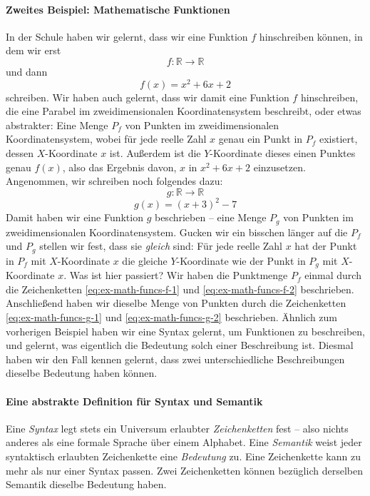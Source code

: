 \documentclass{article}
\begin{document}
\paragraph{Zweites Beispiel: Mathematische Funktionen}
In der Schule haben wir gelernt, dass wir eine Funktion $f$ hinschreiben 
können, in dem wir erst 
\begin{equation}
 f : \mathds{R}\rightarrow\mathds{R}
 \label{eq:ex-math-funcs-f-1}
\end{equation}
und dann 
\begin{equation}
 f(x) = x^2 + 6x + 2
 \label{eq:ex-math-funcs-f-2}
\end{equation}
schreiben. Wir haben auch gelernt, dass wir damit eine Funktion $f$ 
hinschreiben, die eine Parabel im zweidimensionalen Koordinatensystem 
beschreibt, oder etwas abstrakter: Eine Menge $P_f$ von Punkten im 
zweidimensionalen Koordinatensystem, wobei für jede reelle Zahl $x$ genau ein 
Punkt in $P_f$ existiert, dessen $X$-Koordinate $x$ ist. Außerdem ist 
die $Y$-Koordinate dieses einen Punktes genau $f(x)$, also das Ergebnis davon, 
$x$ in $x^2+6x+2$ einzusetzen. Angenommen, wir schreiben noch folgendes dazu: 
\begin{equation}
 g : \mathds{R}\rightarrow\mathds{R}
 \label{eq:ex-math-funcs-g-1}
\end{equation}
\begin{equation}
 g(x) = (x + 3)^2 - 7
 \label{eq:ex-math-funcs-g-2}
\end{equation}
Damit haben wir eine Funktion $g$ beschrieben -- eine Menge $P_g$ von Punkten 
im zweidimensionalen Koordinatensystem. Gucken 
wir ein bisschen länger auf die $P_f$ und $P_g$ stellen wir fest, dass sie 
\emph{gleich} sind: Für jede reelle Zahl $x$ hat der Punkt in $P_f$ mit 
$X$-Koordinate $x$ die gleiche $Y$-Koordinate wie der Punkt in $P_g$ mit 
$X$-Koordinate $x$. Was ist hier passiert? Wir haben die Punktmenge $P_f$ 
einmal durch die Zeichenketten \eqref{eq:ex-math-funcs-f-1} und 
\eqref{eq:ex-math-funcs-f-2} beschrieben. Anschließend haben wir dieselbe Menge 
von Punkten durch die Zeichenketten \eqref{eq:ex-math-funcs-g-1} und 
\eqref{eq:ex-math-funcs-g-2} beschrieben. Ähnlich zum vorherigen Beispiel 
haben wir eine Syntax gelernt, um Funktionen zu beschreiben, und gelernt, was 
eigentlich die Bedeutung solch einer Beschreibung ist. Diesmal haben wir den 
Fall kennen gelernt, dass zwei unterschiedliche Beschreibungen dieselbe 
Bedeutung haben können. 

\paragraph{Eine abstrakte Definition für Syntax und Semantik}
Eine \emph{Syntax} legt stets ein Universum erlaubter \emph{Zeichenketten} fest 
-- also nichts anderes als eine formale Sprache über einem Alphabet. 
Eine \emph{Semantik} weist jeder syntaktisch erlaubten Zeichenkette eine 
\emph{Bedeutung} zu. Eine Zeichenkette kann zu mehr als nur einer Syntax 
passen. Zwei Zeichenketten können bezüglich 
derselben Semantik dieselbe Bedeutung haben.
\end{document}
